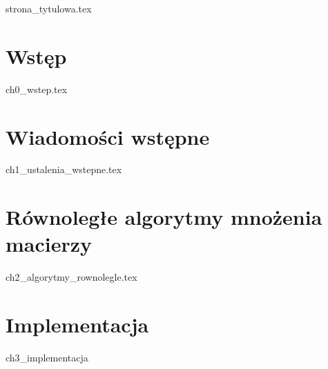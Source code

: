 \documentclass[a4paper,oneside,leqno,12pt]{book}
\begin{document}
{strona_tytulowa.tex}
\tableofcontents

\chapter*{Wstęp}
{ch0_wstep.tex}

\chapter{Wiadomości wstępne}
{ch1_ustalenia_wstepne.tex}

\chapter{Równoległe algorytmy mnożenia macierzy}
{ch2_algorytmy_rownolegle.tex}

\chapter{Implementacja}
{ch3_implementacja}



\end{document}
